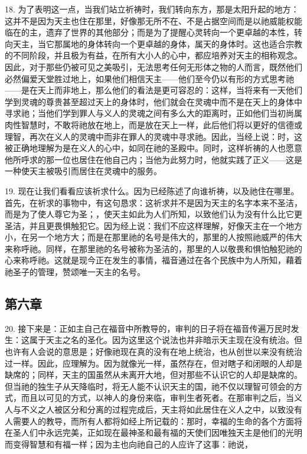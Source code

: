 18. 为了表明这一点，当我们站立祈祷时，我们转向东方，那是太阳升起的地方：这并不是因为天主也住在那里，好像那无所不在、不是占据空间而是以祂威能权能临在的主，遗弃了世界的其他部分；而是为了提醒心灵转向一个更卓越的本性，转向天主，当它那属地的身体转向一个更卓越的身体，属天的身体时。这也适合宗教的不同阶段，并且极为有益，在所有大小人的心中，都应培养对天主的相称观念。因此，对于那些仍被可见之美吸引，无法思考任何无形体之物的人而言，既然他们必然偏爱天堂胜过地上，如果他们相信天主——他们至今仍以有形的方式思考祂——是在天上而非地上，那么他们的看法是更可容忍的：这样，当将来有一天他们学到灵魂的尊贵甚至超过天上的身体时，他们就会在灵魂中而不是在天上的身体中寻求祂；当他们学到罪人与义人的灵魂之间有多么大的距离时，正如他们当初尚属肉性智慧时，不敢将祂放在地上，而是放在天上一样，此后他们将以更好的信德或理智，再次在义人的灵魂中而非在罪人的灵魂中寻求祂。因此，当经上说：时，这被正确地理解为是在义人的心中，如同在祂的圣殿中。同时，这样祈祷的人也愿意他所呼求的那一位也居住在他自己内；当他为此努力时，他就实践了正义——这是一种使天主被吸引而居住在灵魂中的服务。\par

19. 现在让我们看看应该祈求什么。因为已经陈述了向谁祈祷，以及祂住在哪里。首先，在祈求的事物中，有这句恳求：这祈求并不是因为天主的名字本来不圣洁，而是为了使人尊它为圣；，使天主如此为人们所知，以致他们认为没有什么比它更圣洁，并且更畏惧触犯它。因为经上说：我们不应这样理解，好像天主在一个地方小，在另一个地方大；而是在那里祂的名号是伟大的，那里的人按照祂威严的伟大来称呼祂。同样，在那里祂的名号被称为圣洁的，那里的人以敬畏和惧怕触犯祂的心来称呼祂。这就是现今正在发生的事情，福音通过在各个民族中为人所知，藉着祂圣子的管理，赞颂唯一天主的名号。\par


\subsection{第六章}

20. 接下来是：正如主自己在福音中所教导的，审判的日子将在福音传遍万民时发生：这属于天主之名的圣化。因为这里这个说法也并非暗示天主现在没有统治。但也许有人会说的意思是；好像祂现在真的没有在地上统治，也从创世以来没有统治过一样。因此，应理解为。因为就像光一样，虽然存在，但对瞎子和闭眼的人却是缺席的；同样，天主的国虽然从未离开大地，但对那些不认识它的人却是缺席的。但当祂的独生子从天降临时，将无人能不认识天主的国，祂不仅以理智可领会的方式，而且以可见的方式，以神人的身份来临，审判生者死者。在那审判之后，当义人与不义之人被区分和分离的过程完成后，天主将如此居住在义人之中，以致没有人需要人的教导，而所有人都将如经上所记载的：那时，幸福的生命的各个方面将在圣人们中永远完美，正如现在最神圣和最有福的天使们因唯独天主是他们的光明而变得智慧和有福一样；因为主也向祂自己的人应许了这事：祂说，\par

